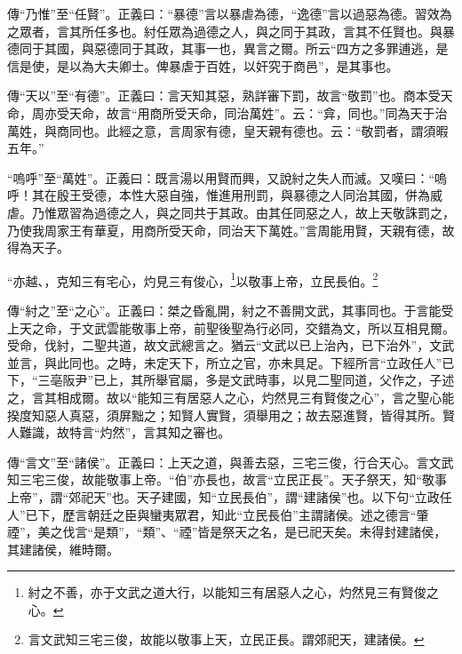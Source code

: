 {\noindent\zhuan{}\fzbyks 傳“乃惟”至“任賢”。正義曰：“暴德”言以暴虐為德，“逸德”言以過惡為德。習效為之眾者，言其所任多也。紂任眾為過德之人，與之同于其政，言其不任賢也。與暴德同于其國，與惡德同于其政，其事一也，異言之爾。所云“四方之多罪逋逃，是信是使，是以為大夫卿士。俾暴虐于百姓，以奸究于商邑”，是其事也。 \par}

{\noindent\zhuan{}\fzbyks 傳“天以”至“有德”。正義曰：言天知其惡，熟詳審下罰，故言“敬罰”也。商本受天命，周亦受天命，故言“用商所受天命，同治萬姓”。云：“弇，同也。”同為天于治萬姓，與商同也。此經之意，言周家有德，皇天親有德也。云：“敬罰者，謂須暇五年。” \par}

{\noindent\shu{}\fzkt “嗚呼”至“萬姓”。正義曰：既言湯以用賢而興，又說紂之失人而滅。又嘆曰：“嗚呼！其在殷王受德，本性大惡自強，惟進用刑罰，與暴德之人同治其國，併為威虐。乃惟眾習為過德之人，與之同共于其政。由其任同惡之人，故上天敬誅罰之，乃使我周家王有華夏，用商所受天命，同治天下萬姓。”言周能用賢，天親有德，故得為天子。 \par}

“亦越、，克知三有宅心，灼見三有俊心，\footnote{紂之不善，亦于文武之道大行，以能知三有居惡人之心，灼然見三有賢俊之心。}以敬事上帝，立民長伯。\footnote{言文武知三宅三俊，故能以敬事上天，立民正長。謂郊祀天，建諸侯。}


{\noindent\zhuan{}\fzbyks 傳“紂之”至“之心”。正義曰：桀之昏亂開，紂之不善開文武，其事同也。于言能受上天之命，于文武雲能敬事上帝，前聖後聖為行必同，交錯為文，所以互相見爾。受命，伐紂，二聖共道，故文武總言之。猶云“文武以已上治內，已下治外”，文武並言，與此同也。之時，未定天下，所立之官，亦未具足。下經所言“立政任人”已下，“三亳阪尹”已上，其所舉官屬，多是文武時事，以見二聖同道，父作之，子述之，言其相成爾。故以“能知三有居惡人之心，灼然見三有賢俊之心”，言之聖心能揆度知惡人真惡，須屏黜之；知賢人實賢，須舉用之；故去惡進賢，皆得其所。賢人難識，故特言“灼然”，言其知之審也。 \par}

{\noindent\zhuan{}\fzbyks 傳“言文”至“諸侯”。正義曰：上天之道，與善去惡，三宅三俊，行合天心。言文武知三宅三俊，故能敬事上帝。“伯”亦長也，故言“立民正長”。天子祭天，知“敬事上帝”，謂“郊祀天”也。天子建國，知“立民長伯”，謂“建諸侯”也。以下句“立政任人”已下，歷言朝廷之臣與蠻夷眾君，知此“立民長伯”主謂諸侯。述之德言“肇禋”，美之伐言“是類”，“類”、“禋”皆是祭天之名，是已祀天矣。未得封建諸侯，其建諸侯，維時爾。 \par}

